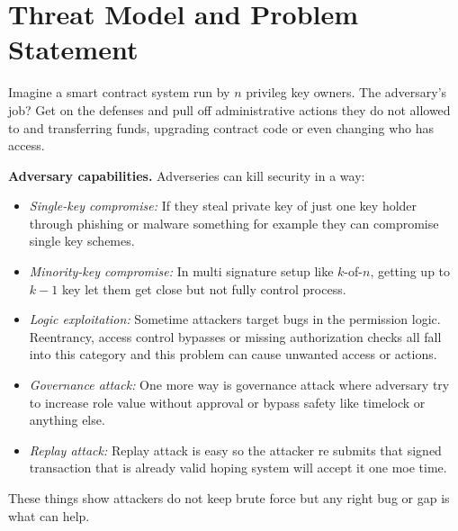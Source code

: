 \documentclass[conference]{IEEEtran}
\begin{document}
\section{Threat Model and Problem Statement}
\label{sec:threat}

Imagine a smart contract system run by $n$ privileg key owners.
The adversary's job?  Get on the defenses and pull off
administrative actions they do not allowed to and transferring
funds, upgrading contract code or even changing who has
access.

\textbf{Adversary capabilities.}  Adverseries can kill security in
a way:
\begin{itemize}
  \item \emph{Single-key compromise:} If they steal private key of
        just one key holder through phishing or malware something for
        example they can compromise single key schemes.
  \item \emph{Minority-key compromise:} In multi signature setup like
        $k$-of-$n$, getting up to $k{-}1$ key let them get close
        but not fully control process.
  \item \emph{Logic exploitation:} Sometime attackers target bugs in
        the permission logic.  Reentrancy, access control bypasses or
        missing authorization checks all fall into this category and
        this problem can cause unwanted access or actions.
  \item \emph{Governance attack:} One more way is governance
        attack where adversary try to increase role value without
        approval or bypass safety like timelock or anything else.
  \item \emph{Replay attack:} Replay attack is easy so the attacker
        re submits that signed transaction that is already valid
        hoping system will accept it one moe time.
\end{itemize}
These things show attackers do not keep brute
force but any right bug or gap is what can help.
\end{document}
